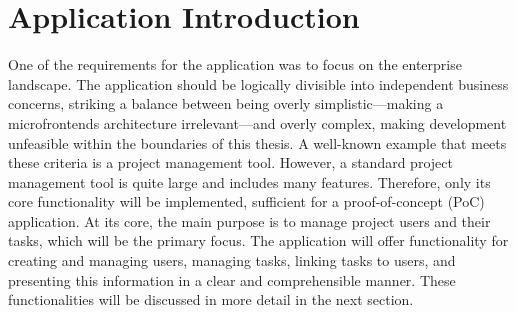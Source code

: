 \section{Application Introduction}
One of the requirements for the application was to focus on the enterprise landscape. The application should be logically divisible into independent business concerns, striking a balance between being overly simplistic—making a microfrontends architecture irrelevant—and overly complex, making development unfeasible within the boundaries of this thesis. A well-known example that meets these criteria is a project management tool. However, a standard project management tool is quite large and includes many features. Therefore, only its core functionality will be implemented, sufficient for a proof-of-concept (PoC) application. At its core, the main purpose is to manage project users and their tasks, which will be the primary focus. The application will offer functionality for creating and managing users, managing tasks, linking tasks to users, and presenting this information in a clear and comprehensible manner. These functionalities will be discussed in more detail in the next section.